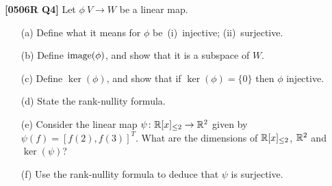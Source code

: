 \documentclass[a4paper]{article}
\begin{document}
\begin{problem}\textbf{[0506R Q4]}
 Let $\phi\:V\to W$ be a linear map.
 \begin{itemize}
  \item[(a)]
   Define what it means for $\phi$
   be~(i)~injective; (ii)~surjective. 
  \item[(b)] 
   Define $\operatorname{image}(\phi)$, and show that it is a subspace of
   $W$. 
  \item[(c)] Define $\ker(\phi)$, and show that if $\ker(\phi)=\{0\}$
   then $\phi$ injective. 
  \item[(d)] State the rank-nullity formula.  
  \item[(e)] Consider the linear map
   $\psi\colon{\mathbb{R}}[x]_{\leq 2}\to{\mathbb{R}}^2$ given by $\psi(f)=[f(2),f(3)]^T$.
   What are the dimensions of ${\mathbb{R}}[x]_{\leq 2}$, ${\mathbb{R}}^2$ and
   $\ker(\psi)$?  
  \item[(f)] Use the rank-nullity formula to deduce that $\psi$ is
   surjective. 
 \end{itemize}
\end{problem}
\end{document}
